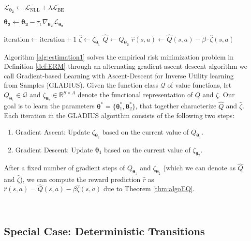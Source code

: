 \begin{algorithm}
\begin{algorithmic}[1]
    \State $\mathcal{L}_{\boldsymbol{\theta_2}} \gets \overline{\mathcal{L}_{\mathrm{NLL}}} 
    + \lambda \overline{\mathcal{L}_{\mathrm{BE}}}$
    
    \State $\boldsymbol{\theta_2} \gets \boldsymbol{\theta_2} - \tau_1 \nabla_{\boldsymbol{\theta_2}} \mathcal{L}_{\boldsymbol{\theta_2}}$
    
    \State $\text{iteration} \gets \text{iteration} + 1$
\EndWhile
\State $\widehat{\zeta} \gets \zeta_{\boldsymbol{\theta_1}}$
\State $\widehat{Q} \gets Q_{\boldsymbol{\theta_2}}$
\State $\widehat{r}(s, a) \gets \widehat{Q}(s, a) - \beta \cdot \widehat{\zeta} (s, a)$
\end{algorithmic}
\end{algorithm}

\noindent Algorithm \ref{alg:estimation1} solves the empirical risk minimization problem in Definition \ref{def:ERM} through an alternating gradient ascent descent algorithm we call Gradient-based Learning with Ascent-Descent for Inverse Utility learning from Samples (GLADIUS). Given the function class $\mathcal{Q}$ of value functions, let $Q_{\boldsymbol{\theta}_1}\in\mathcal{Q}$ and $\zeta_{\boldsymbol{\theta}_2}\in\mathbb{R}^{S\times A}$ denote the functional representation of $Q$ and $\zeta$. Our goal is to learn the parameters $\boldsymbol{\theta}^*= \{\boldsymbol{\theta}_1^*, \boldsymbol{\theta}_2^* \}$, that together characterize $\hat{Q}$ and $\hat{\zeta}$. Each iteration in the GLADIUS algorithm consists of the following two steps: 
\begin{enumerate}[noitemsep]
    \item Gradient Ascent: Update $\zeta_{\boldsymbol{\theta}_2}$ based on the current value of $Q_{\boldsymbol{\theta}_1}$.
    \item Gradient Descent: Update $\boldsymbol{\theta}_1$ based on the current value of $\zeta_{\boldsymbol{\theta}_2}$.
\end{enumerate}
After a fixed number of gradient steps of $Q_{\boldsymbol{\theta}_1}$ and $\zeta_{\boldsymbol{\theta}_2}$ (which we can denote as $\hat{Q}$ and $\hat{\zeta}$), we can compute the reward prediction $\hat{r}$ as 
$\hat{r}(s,a) = \hat{Q}(s,a) - \beta \hat{\zeta}(s,a)$ due to Theorem \ref{thm:algoEQ}.

\;
\\

\subsection*{Special Case: Deterministic Transitions}

